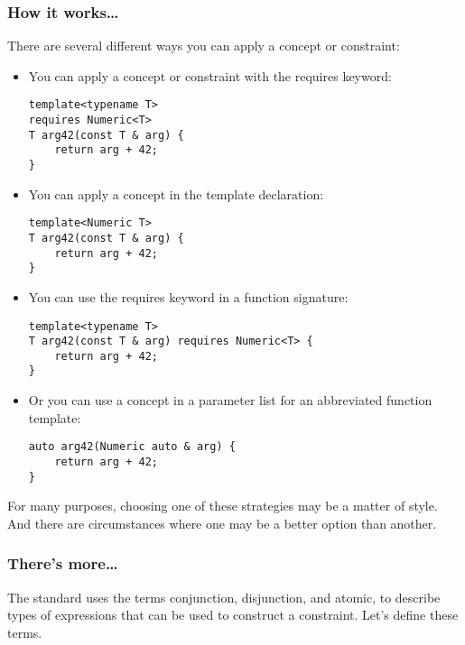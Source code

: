 \subsubsection{How it works…}

There are several different ways you can apply a concept or constraint:

\begin{itemize}
\item 
You can apply a concept or constraint with the requires keyword:

\begin{lstlisting}[style=styleCXX]
template<typename T>
requires Numeric<T>
T arg42(const T & arg) {
	return arg + 42;
}
\end{lstlisting}


\item 
You can apply a concept in the template declaration:

\begin{lstlisting}[style=styleCXX]
template<Numeric T>
T arg42(const T & arg) {
	return arg + 42;
}
\end{lstlisting}

\item 
You can use the requires keyword in a function signature:

\begin{lstlisting}[style=styleCXX]
template<typename T>
T arg42(const T & arg) requires Numeric<T> {
	return arg + 42;
}
\end{lstlisting}

\item 
Or you can use a concept in a parameter list for an abbreviated function template:

\begin{lstlisting}[style=styleCXX]
auto arg42(Numeric auto & arg) {
	return arg + 42;
}
\end{lstlisting}
\end{itemize}

For many purposes, choosing one of these strategies may be a matter of style. And there are circumstances where one may be a better option than another.

\subsubsection{There's more…}

The standard uses the terms conjunction, disjunction, and atomic, to describe types of expressions that can be used to construct a constraint. Let's define these terms.

